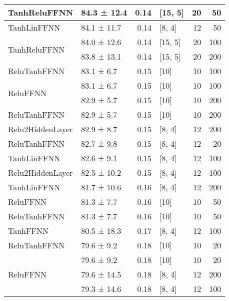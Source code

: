 \begin{longtable}{llrlrr}
 \hline
TanhReluFFNN         & 84.3 ± 12.4 &  0.14 & [15, 5]        &         20 &       50 \\
 \hline
TanhLinFFNN         & 84.1 ± 11.7 &  0.14 & [8, 4]         &         12 &       50 \\
 \hline
\multirow{2}{*}{TanhReluFFNN}         & 84.0 ± 12.6 &  0.14 & [15, 5]        &         20 &      100 \\
         & 83.8 ± 13.1 &  0.14 & [15, 5]        &         20 &      200 \\
 \hline
ReluTanhFFNN         & 83.1 ± 6.7  &  0.15 & [10]           &         10 &      100 \\
 \hline
\multirow{2}{*}{ReluFFNN}         & 83.1 ± 6.7  &  0.15 & [10]           &         10 &      100 \\
         & 82.9 ± 5.7  &  0.15 & [10]           &         10 &      200 \\
 \hline
ReluTanhFFNN         & 82.9 ± 5.7  &  0.15 & [10]           &         10 &      200 \\
 \hline
Relu2HiddenLayer         & 82.9 ± 8.7  &  0.15 & [8, 4]         &         12 &      200 \\
 \hline
ReluTanhFFNN         & 82.7 ± 9.8  &  0.15 & [8, 4]         &         12 &       20 \\
 \hline
TanhLinFFNN         & 82.6 ± 9.1  &  0.15 & [8, 4]         &         12 &      100 \\
 \hline
Relu2HiddenLayer         & 82.5 ± 10.2 &  0.15 & [8, 4]         &         12 &      100 \\
 \hline
TanhLinFFNN         & 81.7 ± 10.6 &  0.16 & [8, 4]         &         12 &      200 \\
 \hline
ReluFFNN         & 81.3 ± 7.7  &  0.16 & [10]           &         10 &       50 \\
 \hline
ReluTanhFFNN         & 81.3 ± 7.7  &  0.16 & [10]           &         10 &       50 \\
 \hline
TanhFFNN         & 80.5 ± 18.3 &  0.17 & [8, 4]         &         12 &      100 \\
 \hline
ReluTanhFFNN         & 79.6 ± 9.2  &  0.18 & [10]           &         10 &       20 \\
 \hline
\multirow{3}{*}{ReluFFNN}         & 79.6 ± 9.2  &  0.18 & [10]           &         10 &       20 \\
         & 79.6 ± 14.5 &  0.18 & [8, 4]         &         12 &      200 \\
         & 79.3 ± 14.6 &  0.18 & [8, 4]         &         12 &      100 \\

\end{longtable}
